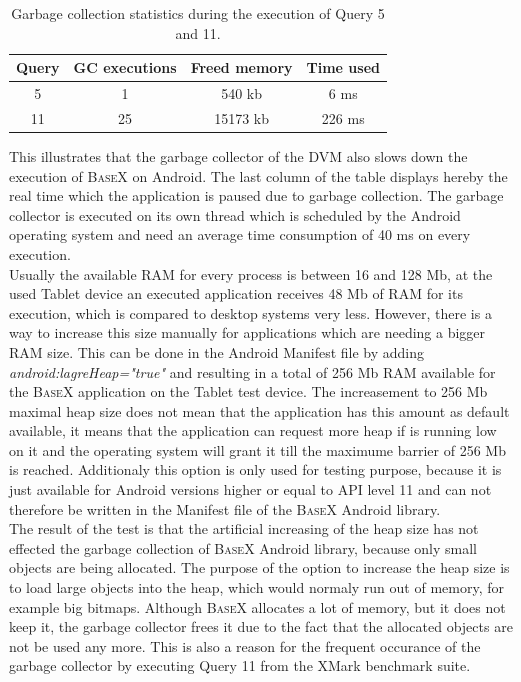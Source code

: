 \begin{table}[htpb]
	\centering
	\begin{tabular}{|c|c|c|c|}
		\hline
		Query&GC executions&Freed memory&Time used\\
		\hline
		5&1&540 kb&6 ms\\
		\hline
		11&25&15173 kb&226 ms\\
		\hline
	\end{tabular}
	\caption{Garbage collection statistics during the execution of Query 5 and 11.}
	\label{tab:gc-stats}
\end{table}

This illustrates that the garbage collector of the DVM also slows down the execution of \textsc{BaseX} on Android.
The last column of the table displays hereby the real time which the application is paused due to garbage collection.
The garbage collector is executed on its own thread which is scheduled by the Android operating system and need an average time consumption of 40 ms on every execution.\\
Usually the available RAM for every process is between 16 and 128 Mb, at the used Tablet device an executed application receives 48 Mb of RAM for its execution, which is compared to desktop systems very less.
However, there is a way to increase this size manually for applications which are needing a bigger RAM size.
This can be done in the Android Manifest file by adding \textit{android:lagreHeap="true"} and resulting in a total of 256 Mb RAM available for the \textsc{BaseX} application on the Tablet test device.
The increasement to 256 Mb maximal heap size does not mean that the application has this amount as default available, it means that the application can request more heap if is running low on it and the operating system will grant it till the maximume barrier of 256 Mb is reached.
Additionaly this option is only used for testing purpose, because it is just available for Android versions higher or equal to API level 11 and can not therefore be written in the Manifest file of the \textsc{BaseX} Android library.\\
The result of the test is that the artificial increasing of the heap size has not effected the garbage collection of \textsc{BaseX} Android library, because only small objects are being allocated.
The purpose of the option to increase the heap size is to load large objects into the heap, which would normaly run out of memory, for example big bitmaps.
Although \textsc{BaseX} allocates a lot of memory, but it does not keep it, the garbage collector frees it due to the fact that the allocated objects are not be used any more.
This is also a reason for the frequent occurance of the garbage collector by executing Query 11 from the XMark benchmark suite.





